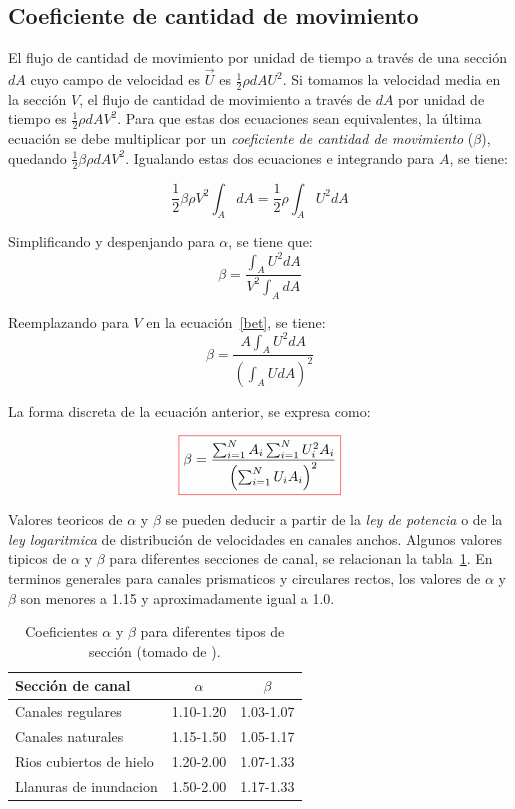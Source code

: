 \documentclass[11pt, oneside]{article}
\begin{document}
\subsection{Coeficiente de cantidad de movimiento}
El flujo de cantidad de movimiento por unidad de tiempo a trav\'es de una secci\'on $dA$ cuyo campo de velocidad es $\vec{U}$ es $\frac{1}{2}\rho dA U^2$. Si tomamos la velocidad media en la secci\'on $V$, el flujo de cantidad de movimiento a trav\'es de $dA$ por unidad de tiempo es $\frac{1}{2}\rho dA V^2$. Para que estas dos ecuaciones sean equivalentes, la \'ultima ecuaci\'on se debe multiplicar por un \emph{coeficiente de cantidad de movimiento} ($\beta$), quedando $\frac{1}{2}\beta \rho dA V^2$. Igualando estas dos ecuaciones e integrando para $A$, se tiene:

$$
\frac{1}{2}\beta\rho V^2 \int_A dA  = \frac{1}{2}\rho \int_A U^2 dA 
$$

Simplificando y despenjando para $\alpha$, se tiene que:
\begin{equation}
\beta = \frac{\int_A U^2 dA}{V^2 \int_A dA}
\label{bet}
\end{equation}

Reemplazando para $V$ en la ecuaci\'on~\ref{bet}, se tiene:
\begin{equation}
\beta = \frac{A \int_A U^2 dA}{\left(\int_A U dA \right)^2 }
\label{bet2}
\end{equation}

La forma discreta de la ecuaci\'on anterior, se expresa como:

\begin{equation}
\color{red}\boxed{\color{black} \beta = \frac{\sum_{i=1}^{N}A_i \sum_{i=1}^{N} U_i^2 A_i} {\left(\sum_{i=1}^{N} U_i A_i \right)^2 }}
\label{bet3}
\end{equation}

Valores teoricos de $\alpha$ y $\beta$ se pueden deducir a partir de la \emph{ley de potencia} o de la \emph{ley logaritmica} de distribuci\'on de velocidades en canales anchos. Algunos valores tipicos de $\alpha$ y $\beta$ para diferentes secciones de canal, se relacionan la tabla~\ref{tab1}. En terminos generales para canales prismaticos y circulares rectos, los valores de $\alpha$ y $\beta$ son menores a 1.15 y aproximadamente igual a 1.0.

\begin{table}[h!]
\centering
\begin{tabular}{l c c}
 \hline
 Secci\'on de canal & $\alpha$ & $\beta$ \\ [0.5ex]
 \hline\hline
Canales regulares & 1.10-1.20 & 1.03-1.07 \\
Canales naturales & 1.15-1.50 & 1.05-1.17 \\
Rios cubiertos de hielo & 1.20-2.00 & 1.07-1.33 \\
Llanuras de inundacion & 1.50-2.00 & 1.17-1.33 \\
\hline
\end{tabular}
\caption{Coeficientes $\alpha$ y $\beta$ para diferentes tipos de secci\'on (tomado de \cite{Chau}).}
\label{tab1}
\end{table}
\end{document}
